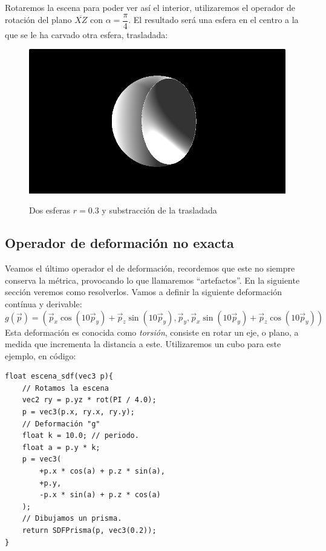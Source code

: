 Rotaremos la escena para poder ver así el interior, utilizaremos el operador de rotación del plano \(\overline{XZ}\) con \(\alpha=\dfrac{\pi}{4}\). El resultado será una esfera en el centro a la que se le ha carvado otra esfera, trasladada:

\begin{figure}[H]
  \centering
  \captionsetup{justification=centering}%
  \includegraphics[width=1.0\textwidth]{secciones/imagenes/sdf/3d/sdf_substract_3d.png}\label{fig:sub3d}
  \caption{Dos esferas \(r=0.3\) y substracción de la trasladada}
\end{figure}

\subsection{Operador de deformación no exacta}
Veamos el último operador el de deformación, recordemos que este no siempre conserva la métrica, provocando lo que llamaremos \enquote{artefactos}. En la siguiente sección veremos como resolverlos. Vamos a definir la siguiente deformación contínua y derivable:
\[g(\Vec{p})=(
\Vec{p}_x \cos(10\Vec{p}_y) + \Vec{p}_z\sin(10\Vec{p}_y),
\Vec{p}_y,
\Vec{p}_x\sin(10\Vec{p}_y) + \Vec{p}_z\cos(10\Vec{p}_y)
)
\]
Esta deformación es conocida como \textit{torsión}, consiste en rotar un eje, o plano, a medida que incrementa la distancia a este. Utilizaremos un cubo para este ejemplo, en código:

\begin{lstlisting}
float escena_sdf(vec3 p){
    // Rotamos la escena
    vec2 ry = p.yz * rot(PI / 4.0);
    p = vec3(p.x, ry.x, ry.y);
    // Deformación "g"
    float k = 10.0; // periodo.
    float a = p.y * k;
    p = vec3(
    	+p.x * cos(a) + p.z * sin(a),
    	+p.y,
        -p.x * sin(a) + p.z * cos(a)
    );
	// Dibujamos un prisma.
    return SDFPrisma(p, vec3(0.2));
}
\end{lstlisting}

